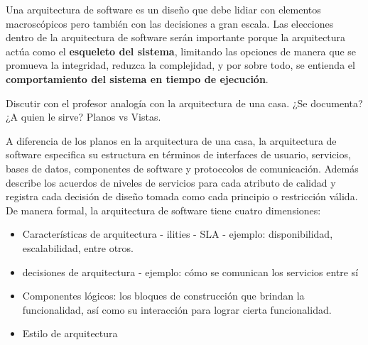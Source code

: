 Una arquitectura de software es un diseño que debe lidiar con elementos macroscópicos pero también con las decisiones a gran escala. Las elecciones dentro de la arquitectura de software serán importante porque la arquitectura actúa como el \textbf{esqueleto del sistema}, limitando las opciones de manera que se promueva la integridad, reduzca la complejidad, y por sobre todo, se entienda el \textbf{comportamiento del sistema en tiempo de ejecución}. 


\begin{tcolorbox}[colback=gray!5!white,colframe=orange!60!gray,title=Analogía Arquitectura de Software]
Discutir con el profesor analogía con la arquitectura de una casa. ¿Se documenta? ¿A quien le sirve? Planos vs Vistas.
\end{tcolorbox}

A diferencia de los planos en la arquitectura de una casa, la arquitectura de software especifica su estructura en términos de interfaces de usuario, servicios, bases de datos, componentes de software y protoccolos de comunicación. Además describe los acuerdos de niveles de servicios para cada atributo de calidad y registra cada decisión de diseño tomada como cada principio o restricción válida. 
De manera formal, la arquitectura de software tiene cuatro dimensiones: 
\begin{itemize}
    \item Características de arquitectura - ilities - SLA - ejemplo: disponibilidad, escalabilidad, entre otros. 
    \item decisiones de arquitectura - ejemplo: cómo se comunican los servicios entre sí
    \item Componentes lógicos: los bloques de construcción que brindan la funcionalidad, así como su interacción para lograr cierta funcionalidad. 
    \item Estilo de arquitectura
\end{itemize}


